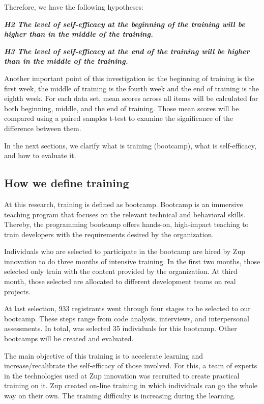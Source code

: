 \documentclass{TheMartianReport}
\begin{document}
Therefore, we have the following hypotheses:
 \newline

\textbf{\textit{H2 The level of self-efficacy at the beginning of the training will be higher than in the middle of the training.}} \newline

\textbf{\textit{H3 The level of self-efficacy at the end of the training will be higher than in the middle of the training.}}
 \newline


Another important point of this investigation is: the beginning of training is the first week, the middle of training is the fourth week and the end of training is the eighth week. For each data set, mean scores across all items will be calculated for both beginning, middle, and the end of training. Those mean scores will be compared using a paired samples t-test to examine the significance of the difference between them. 


In the next sections, we clarify what is training (bootcamp), what is self-efficacy, and how to evaluate it. 


\subsection{How we define training}
At this research, training is defined as bootcamp. Bootcamp is an immersive teaching program that focuses on the relevant technical and behavioral skills. Thereby, the programming bootcamp offers hands-on, high-impact teaching to train developers with the requirements desired by the organization.

Individuals who are selected to participate in the bootcamp are hired by Zup innovation to do three months of intensive training. In the first two months, those selected only train with the content provided by the organization. At third month, those selected are allocated to different development teams on real projects.

At last selection, 933 registrants went through four stages to be selected to our bootcamp. These steps range from code analysis, interviews, and interpersonal assessments. In total, was selected 35 individuals for this bootcamp. Other bootcamps will be created and evaluated. 

The main objective of this training is to accelerate learning and increase/recalibrate the self-efficacy of those involved. For this, a team of experts in the technologies used at Zup innovation was recruited to create practical training on it. Zup created on-line training in which individuals can go the whole way on their own. The training difficulty is increasing during the learning. 
\end{document}
